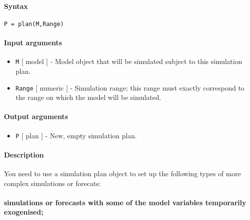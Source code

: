 


	\paragraph{Syntax}\label{syntax}

\begin{verbatim}
P = plan(M,Range)
\end{verbatim}

\paragraph{Input arguments}\label{input-arguments}

\begin{itemize}
\item
  \texttt{M} {[} model {]} - Model object that will be simulated subject
  to this simulation plan.
\item
  \texttt{Range} {[} numeric {]} - Simulation range; this range must
  exactly correspond to the range on which the model will be simulated.
\end{itemize}

\paragraph{Output arguments}\label{output-arguments}

\begin{itemize}
\itemsep1pt\parskip0pt
\item
  \texttt{P} {[} plan {]} - New, empty simulation plan.
\end{itemize}

\paragraph{Description}\label{description}

You need to use a simulation plan object to set up the following types
of more complex simulations or forecats:

\paragraph{simulations or forecasts with some of the model variables
temporarily
exogenised;}\label{simulations-or-forecasts-with-some-of-the-model-variables-temporarily-exogenised}

